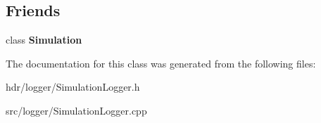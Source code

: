 \subsection*{Friends}
\begin{DoxyCompactItemize}
\item 
class {\bfseries Simulation}\label{class_simulation_logger_aeb51e0a4c44d4192cfbdb79598859172}

\end{DoxyCompactItemize}


The documentation for this class was generated from the following files\-:\begin{DoxyCompactItemize}
\item 
hdr/logger/Simulation\-Logger.\-h\item 
src/logger/Simulation\-Logger.\-cpp\end{DoxyCompactItemize}
